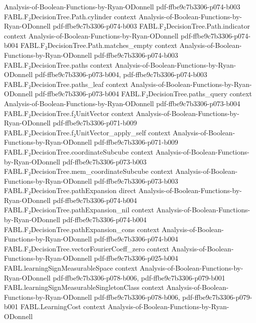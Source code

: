 \begin{theorem}
  {Analysis-of-Boolean-Functions-by-Ryan-ODonnell}
  {pdf-ffbe9c7b3306-p074-b003}
\proofstep
  {FABL.F₂DecisionTree.Path.cylinder}
  {context}
  {Analysis-of-Boolean-Functions-by-Ryan-ODonnell}
  {pdf-ffbe9c7b3306-p074-b003}
\proofstep
  {FABL.F₂DecisionTree.Path.indicator}
  {context}
  {Analysis-of-Boolean-Functions-by-Ryan-ODonnell}
  {pdf-ffbe9c7b3306-p074-b004}
\proofstep
  {FABL.F₂DecisionTree.Path.matches_empty}
  {context}
  {Analysis-of-Boolean-Functions-by-Ryan-ODonnell}
  {pdf-ffbe9c7b3306-p074-b003}
\proofstep
  {FABL.F₂DecisionTree.paths}
  {context}
  {Analysis-of-Boolean-Functions-by-Ryan-ODonnell}
  {pdf-ffbe9c7b3306-p073-b004,
    pdf-ffbe9c7b3306-p074-b003}
\proofstep
  {FABL.F₂DecisionTree.paths_leaf}
  {context}
  {Analysis-of-Boolean-Functions-by-Ryan-ODonnell}
  {pdf-ffbe9c7b3306-p073-b004}
\proofstep
  {FABL.F₂DecisionTree.paths_query}
  {context}
  {Analysis-of-Boolean-Functions-by-Ryan-ODonnell}
  {pdf-ffbe9c7b3306-p073-b004}
\proofstep
  {FABL.F₂DecisionTree.f₂UnitVector}
  {context}
  {Analysis-of-Boolean-Functions-by-Ryan-ODonnell}
  {pdf-ffbe9c7b3306-p071-b009}
\proofstep
  {FABL.F₂DecisionTree.f₂UnitVector_apply_self}
  {context}
  {Analysis-of-Boolean-Functions-by-Ryan-ODonnell}
  {pdf-ffbe9c7b3306-p071-b009}
\proofstep
  {FABL.F₂DecisionTree.coordinateSubcube}
  {context}
  {Analysis-of-Boolean-Functions-by-Ryan-ODonnell}
  {pdf-ffbe9c7b3306-p073-b003}
\proofstep
  {FABL.F₂DecisionTree.mem_coordinateSubcube}
  {context}
  {Analysis-of-Boolean-Functions-by-Ryan-ODonnell}
  {pdf-ffbe9c7b3306-p073-b003}
\proofstep
  {FABL.F₂DecisionTree.pathExpansion}
  {direct}
  {Analysis-of-Boolean-Functions-by-Ryan-ODonnell}
  {pdf-ffbe9c7b3306-p074-b004}
\proofstep
  {FABL.F₂DecisionTree.pathExpansion_nil}
  {context}
  {Analysis-of-Boolean-Functions-by-Ryan-ODonnell}
  {pdf-ffbe9c7b3306-p074-b004}
\proofstep
  {FABL.F₂DecisionTree.pathExpansion_cons}
  {context}
  {Analysis-of-Boolean-Functions-by-Ryan-ODonnell}
  {pdf-ffbe9c7b3306-p074-b004}
\proofstep
  {FABL.F₂DecisionTree.vectorFourierCoeff_zero}
  {context}
  {Analysis-of-Boolean-Functions-by-Ryan-ODonnell}
  {pdf-ffbe9c7b3306-p025-b004}
\proofstep
  {FABL.learningSignMeasurableSpace}
  {context}
  {Analysis-of-Boolean-Functions-by-Ryan-ODonnell}
  {pdf-ffbe9c7b3306-p078-b006,
    pdf-ffbe9c7b3306-p079-b001}
\proofstep
  {FABL.learningSignMeasurableSingletonClass}
  {context}
  {Analysis-of-Boolean-Functions-by-Ryan-ODonnell}
  {pdf-ffbe9c7b3306-p078-b006,
    pdf-ffbe9c7b3306-p079-b001}
\proofstep
  {FABL.LearningCost}
  {context}
  {Analysis-of-Boolean-Functions-by-Ryan-ODonnell}

\end{theorem}
